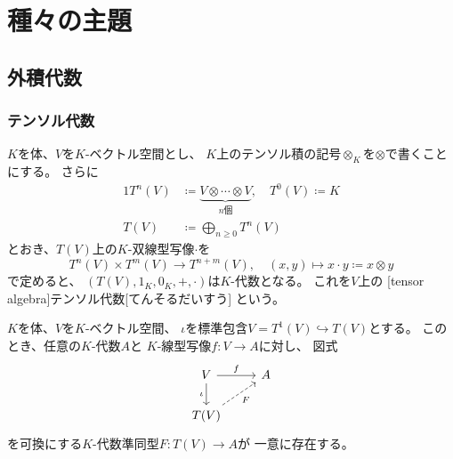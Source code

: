 \documentclass[report]{jlreq}
\begin{document}
%
\part{種々の主題}




%
\chapter{外積代数}

%
\section{テンソル代数}

\begin{definition}[テンソル代数]
    $K$を体、$V$を$K$-ベクトル空間とし、
    $K$上のテンソル積の記号$\otimes_K$を$\otimes$で書くことにする。
    さらに
    \begin{alignat}{1}
        T^n(V) &\coloneqq \underbrace{
            V \otimes \cdots \otimes V
        }_{\text{$n$個}},
            \quad T^0(V) \coloneqq K \\
        T(V) &\coloneqq \bigoplus_{n \ge 0} T^n(V)
    \end{alignat}
    とおき、$T(V)$上の$K$-双線型写像$\cdot$を
    \begin{equation}
        T^n(V) \times T^m(V) \to T^{n+m}(V),
        \quad
        (x, y) \mapsto x \cdot y \coloneqq x \otimes y
    \end{equation}
    で定めると、
    $(T(V), 1_K, 0_K, +, \cdot)$は$K$-代数となる。
    これを$V$上の
    [tensor algebra]{テンソル代数}[てんそるだいすう]
    という。
\end{definition}

\begin{theorem}[テンソル代数の普遍性]
    $K$を体、$V$を$K$-ベクトル空間、
    $\iota$を標準包含$V = T^1(V) \hookrightarrow T(V)$とする。
    このとき、任意の$K$-代数$A$と
    $K$-線型写像$f \colon V \to A$に対し、
    図式
    \begin{equation}
        \begin{tikzcd}
            V
                \ar{r}{f}
                \ar{d}[swap]{\iota}
                & A \\
            T(V)
                \ar[dashed]{ru}[swap]{F}
        \end{tikzcd}
    \end{equation}
    を可換にする$K$-代数準同型$F \colon T(V) \to A$が
    一意に存在する。
\end{theorem}
\end{document}
